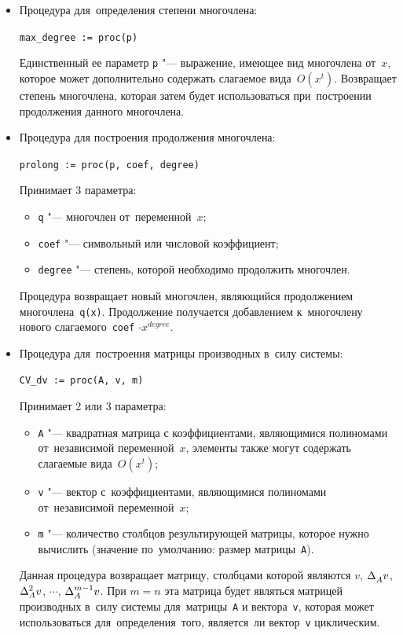 \begin{itemize}
    \item
        Процедура для~определения степени многочлена:
        
        \verb|max_degree := proc(p)|

        Единственный ее параметр \verb|p| "--- выражение, имеющее вид многочлена от~$x$,
        которое может дополнительно содержать слагаемое вида~$O(x^t)$.
        Возвращает степень многочлена, которая затем будет использоваться при~построении продолжения данного многочлена.

    \item
        Процедура для построения продолжения многочлена:
        
        \verb|prolong := proc(p, coef, degree)|

        Принимает 3 параметра:
        \begin{itemize}
            \item
                \verb|q| "--- многочлен от~переменной~$x$;
            \item
                \verb|coef| "--- символьный или числовой коэффициент;
            \item
                \verb|degree| "--- степень, которой необходимо продолжить многочлен.
        \end{itemize}

        Процедура возвращает новый многочлен, являющийся продолжением многочлена~\verb|q(x)|.
        Продолжение получается добавлением к~многочлену нового слагаемого~\verb|coef| $\cdot x^{degree}$.

    \item
        Процедура для~построения матрицы производных в~силу системы:
        
        \verb|CV_dv := proc(A, v, m)|
        
        \newpage
        Принимает 2 или 3 параметра:
        \begin{itemize}
            \item
                \verb|A| "--- квадратная матрица с коэффициентами, являющимися полиномами от~независимой переменной~$x$,
                элементы также могут содержать слагаемые вида~$O(x^t)$;
            \item
                \verb|v| "--- вектор с~коэффициентами, являющимися полиномами от~независимой переменной~$x$;
            \item
                \verb|m| "--- количество столбцов результирующей матрицы, которое нужно вычислить
                (значение по~умолчанию: размер матрицы~\verb|A|).
        \end{itemize}

        Данная процедура возвращает матрицу,
        столбцами которой являются $v$, $\diffVector$, $\diffVector[2]$, $\cdots$, $\diffVector[m-1]$.
        При $m=n$ эта матрица будет являться матрицей производных в~силу системы для~матрицы~\verb|A| и вектора~\verb|v|,
        которая может использоваться для~определения~того, является~ли вектор~\verb|v| циклическим.
\end{itemize}

